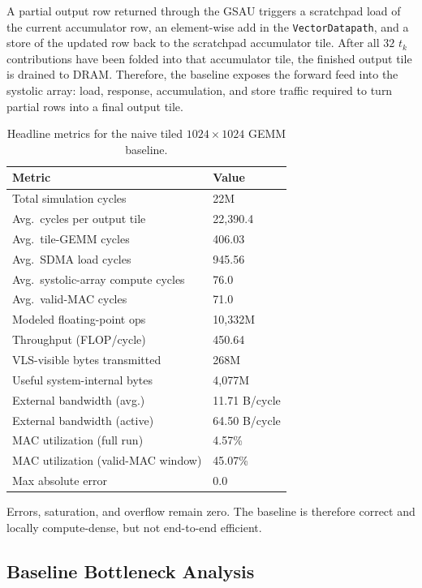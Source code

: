 A partial output row returned through the GSAU triggers a scratchpad load of the current accumulator row, an element-wise add in the \texttt{VectorDatapath}, and a store of the updated row back to the scratchpad accumulator tile. After all $32$ $t_k$ contributions have been folded into that accumulator tile, the finished output tile is drained to DRAM. Therefore, the baseline exposes the forward feed into the systolic array: load, response, accumulation, and store traffic required to turn partial rows into a final output tile.

\begin{table}[ht]
\centering
\caption{Headline metrics for the naive tiled $1024 \times 1024$ GEMM baseline.}
\label{tab:naive-baseline}
\begin{tabular}{ll}
\toprule
\textbf{Metric} & \textbf{Value} \\
\midrule
Total simulation cycles & 22M \\
Avg.\ cycles per output tile & 22{,}390.4 \\
Avg.\ tile-GEMM cycles & 406.03 \\
Avg.\ SDMA load cycles & 945.56 \\
Avg.\ systolic-array compute cycles & 76.0 \\
Avg.\ valid-MAC cycles & 71.0 \\
Modeled floating-point ops & 10{,}332M \\
Throughput (FLOP/cycle) & 450.64 \\
VLS-visible bytes transmitted & 268M \\
Useful system-internal bytes & 4{,}077M \\
External bandwidth (avg.) & 11.71 B/cycle \\
External bandwidth (active) & 64.50 B/cycle \\
MAC utilization (full run) & 4.57\% \\
MAC utilization (valid-MAC window) & 45.07\% \\
Max absolute error & 0.0 \\
\bottomrule
\end{tabular}
\end{table}

Errors, saturation, and overflow remain zero. The baseline is therefore correct and locally compute-dense, but not end-to-end efficient.

\subsection{Baseline Bottleneck Analysis}


